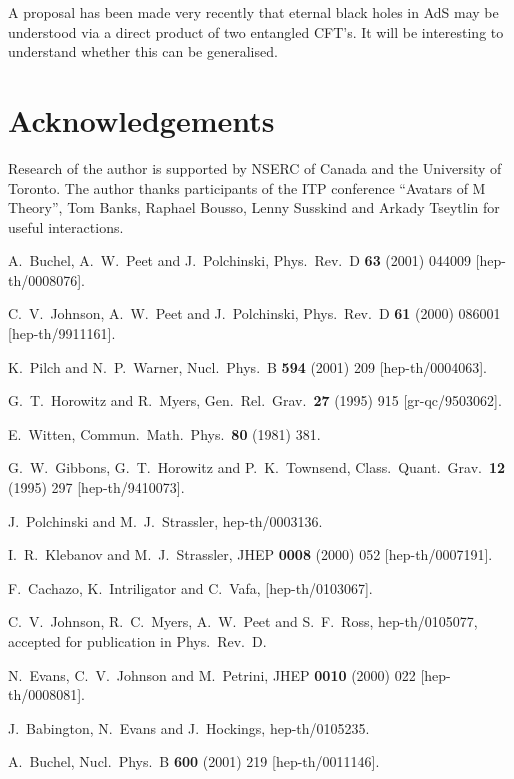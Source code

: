 \documentclass[a4paper,12pt]{amsproc}
\numberwithin{equation}{section}
\begin{document}
A proposal has been made very recently \cite{juanavatar} that eternal
black holes in AdS may be understood via a direct product of two
entangled CFT's.  It will be interesting to understand whether this
can be generalised.

\section*{Acknowledgements}

Research of the author is supported by NSERC of Canada and the
University of Toronto.
%
The author thanks participants of the ITP conference ``Avatars of M
Theory'', 
Tom Banks, Raphael Bousso, Lenny Susskind and Arkady Tseytlin for
useful interactions.


\begin{thebibliography}{99}

 A.~Buchel, A.~W.~Peet and J.~Polchinski, 
Phys.\ Rev.\ D {\bf 63} (2001) 044009 [hep-th/0008076].

 C.~V.~Johnson, A.~W.~Peet and J.~Polchinski,
Phys.\ Rev.\ D {\bf 61} (2000) 086001 [hep-th/9911161].

 K.~Pilch and N.~P.~Warner,
Nucl.\ Phys.\ B {\bf 594} (2001) 209
[hep-th/0004063].

 G.~T.~Horowitz and R.~Myers, 
Gen.\ Rel.\ Grav.\ {\bf 27} (1995) 915 [gr-qc/9503062].

 E.~Witten, 
Commun.\ Math.\ Phys.\ {\bf 80} (1981) 381.

 G.~W.~Gibbons, G.~T.~Horowitz and P.~K.~Townsend,
Class.\ Quant.\ Grav.\ {\bf 12} (1995) 297 [hep-th/9410073].

 J.~Polchinski and M.~J.~Strassler,
hep-th/0003136.

 I.~R.~Klebanov and M.~J.~Strassler,
JHEP {\bf 0008} (2000) 052
[hep-th/0007191].

 F.~Cachazo, K.~Intriligator and C.~Vafa,
[hep-th/0103067].

 C.~V.~Johnson, R.~C.~Myers, A.~W.~Peet and S.~F.~Ross,
hep-th/0105077, accepted for publication in Phys.\ Rev.\ D.

 N.~Evans, C.~V.~Johnson and M.~Petrini,
JHEP {\bf 0010} (2000) 022 [hep-th/0008081].

 J.~Babington, N.~Evans and J.~Hockings,
hep-th/0105235.

 A.~Buchel,
Nucl.\ Phys.\ B {\bf 600} (2001) 219
[hep-th/0011146].


\end{thebibliography}
\end{document}
